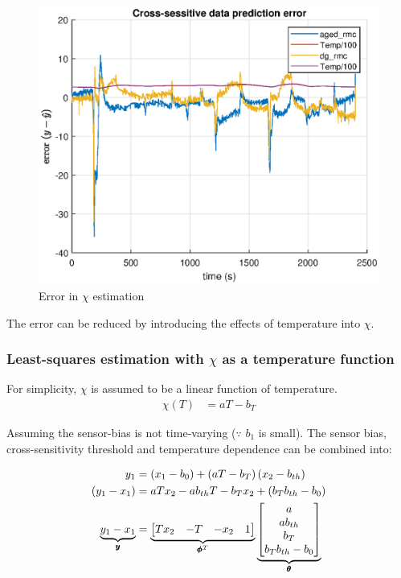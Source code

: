 \begin{figure}[H]
    \centering
    \includegraphics[width = 0.5 \textwidth]{./figs/chi_est/chi_error.eps}
    \caption{Error in $\chi$ estimation}
\end{figure}

The error can be reduced by introducing the effects of temperature into $\chi$.


\subsubsection{Least-squares estimation with $\chi$ as a temperature function}
For simplicity, $\chi$ is assumed to be a linear function of temperature.
\begin{align*}
    \chi(T) &= a T - b_T
\end{align*}

Assuming the sensor-bias is not time-varying ($\because$ $b_1$ is small). The
sensor bias, cross-sensitivity threshold and temperature dependence can be
combined into:

\begin{align*}
    y_1 &=  \left( x_1 - b_0 \right) + \left( aT - b_{T} \right) \left( x_2 - b_{th} \right)\\
    \left( y_1 - x_1 \right) &= a T x_2 - a b_{th} T - b_{T} x_2 + (b_T b_{th} - b_0)\\
    \underbrace{y_1 - x_1}_{\pmb y} &= \underbrace{\begin{bmatrix} T x_2 & -T & -x_2 & 1 \end{bmatrix}}_{\pmb \phi^T} \underbrace{\begin{bmatrix} a \\ a b_{th} \\ b_T \\ b_T b_{th} - b_0 \end{bmatrix}}_{\pmb \theta}\\
\end{align*}

